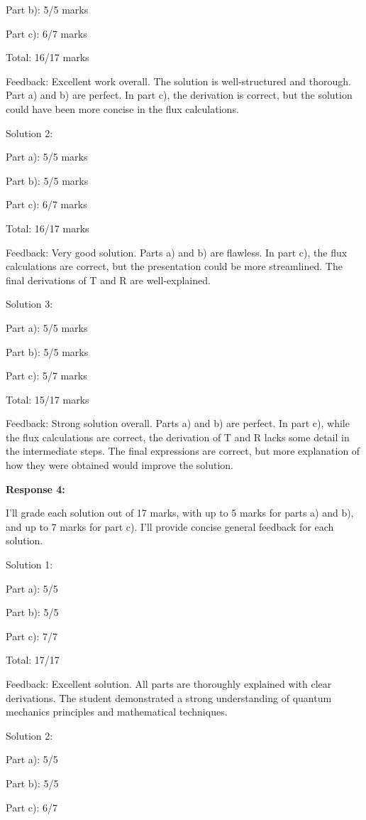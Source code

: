 \documentclass[a4paper,11pt]{article}
\begin{document}
Part b): 5/5 marks

Part c): 6/7 marks

Total: 16/17 marks

Feedback: Excellent work overall. The solution is well-structured and thorough. Part a) and b) are perfect. In part c), the derivation is correct, but the solution could have been more concise in the flux calculations.

Solution 2:

Part a): 5/5 marks

Part b): 5/5 marks

Part c): 6/7 marks

Total: 16/17 marks

Feedback: Very good solution. Parts a) and b) are flawless. In part c), the flux calculations are correct, but the presentation could be more streamlined. The final derivations of T and R are well-explained.

Solution 3:

Part a): 5/5 marks

Part b): 5/5 marks

Part c): 5/7 marks

Total: 15/17 marks

Feedback: Strong solution overall. Parts a) and b) are perfect. In part c), while the flux calculations are correct, the derivation of T and R lacks some detail in the intermediate steps. The final expressions are correct, but more explanation of how they were obtained would improve the solution.

\bigskip   
\textbf{Response 4:}

I'll grade each solution out of 17 marks, with up to 5 marks for parts a) and b), and up to 7 marks for part c). I'll provide concise general feedback for each solution.

Solution 1:

Part a): 5/5

Part b): 5/5

Part c): 7/7

Total: 17/17

Feedback: Excellent solution. All parts are thoroughly explained with clear derivations. The student demonstrated a strong understanding of quantum mechanics principles and mathematical techniques.

Solution 2:

Part a): 5/5

Part b): 5/5

Part c): 6/7
\end{document}
